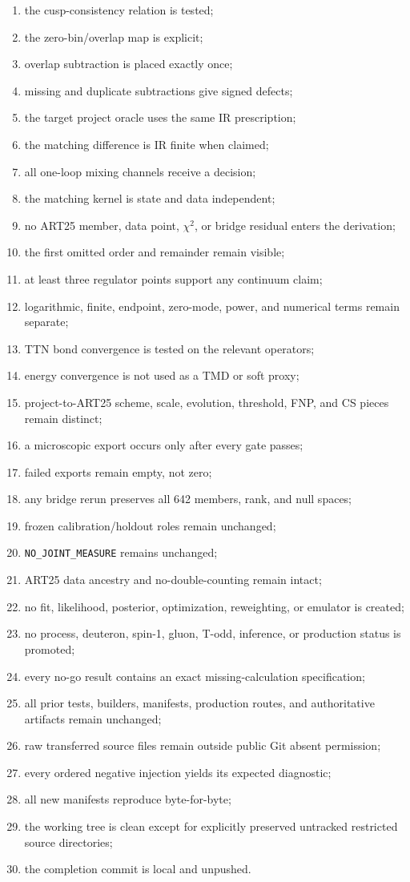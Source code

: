 \documentclass[11pt]{article}
\begin{document}
\begin{enumerate}
\item the cusp-consistency relation is tested;
\item the zero-bin/overlap map is explicit;
\item overlap subtraction is placed exactly once;
\item missing and duplicate subtractions give signed defects;
\item the target project oracle uses the same IR prescription;
\item the matching difference is IR finite when claimed;
\item all one-loop mixing channels receive a decision;
\item the matching kernel is state and data independent;
\item no ART25 member, data point, \(\chi^2\), or bridge residual enters the derivation;
\item the first omitted order and remainder remain visible;
\item at least three regulator points support any continuum claim;
\item logarithmic, finite, endpoint, zero-mode, power, and numerical terms remain separate;
\item TTN bond convergence is tested on the relevant operators;
\item energy convergence is not used as a TMD or soft proxy;
\item project-to-ART25 scheme, scale, evolution, threshold, FNP, and CS pieces remain distinct;
\item a microscopic export occurs only after every gate passes;
\item failed exports remain empty, not zero;
\item any bridge rerun preserves all 642 members, rank, and null spaces;
\item frozen calibration/holdout roles remain unchanged;
\item \texttt{NO\_JOINT\_MEASURE} remains unchanged;
\item ART25 data ancestry and no-double-counting remain intact;
\item no fit, likelihood, posterior, optimization, reweighting, or emulator is created;
\item no process, deuteron, spin-1, gluon, T-odd, inference, or production status is promoted;
\item every no-go result contains an exact missing-calculation specification;
\item all prior tests, builders, manifests, production routes, and authoritative artifacts remain unchanged;
\item raw transferred source files remain outside public Git absent permission;
\item every ordered negative injection yields its expected diagnostic;
\item all new manifests reproduce byte-for-byte;
\item the working tree is clean except for explicitly preserved untracked restricted source directories;
\item the completion commit is local and unpushed.
\end{enumerate}
\end{document}
